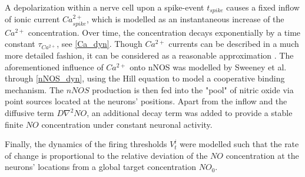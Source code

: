 \documentclass[10pt,a4paper]{article}
\begin{document}
A depolarization within a nerve cell upon a spike-event $t_{spike}$ causes a fixed inflow of ionic current $Ca^{2+}_{spike}$, which is modelled as an instantaneous increase of the $Ca^{2+}$ concentration. Over time, the concentration decays exponentially by a time constant $\tau_{Ca^{2+}}$, see \eqref{Ca_dyn}. Though $Ca^{2+}$ currents can be described in a much more detailed fashion, it can be considered as a reasonable approximation \cite[p.~198-203]{Theor_Neur_Dayan}. The aforementioned influence of $Ca^{2+}$ onto nNOS was modelled by Sweeney et al. through \eqref{nNOS_dyn}, using the Hill equation \cite{Hill_Equ} to model a cooperative binding mechanism. The $nNOS$ production is then fed into the "pool" of nitric oxide via point sources located at the neurons' positions. Apart from the inflow and the diffusive term $D \nabla^2 NO$, an additional decay term was added to provide a stable finite $NO$ concentration under constant neuronal activity.

Finally, the dynamics of the firing thresholds $V_t^i$ were modelled such that the rate of change is proportional to the relative deviation of the $NO$ concentration at the neurons' locations from a global target concentration $NO_0$. 
\end{document}
